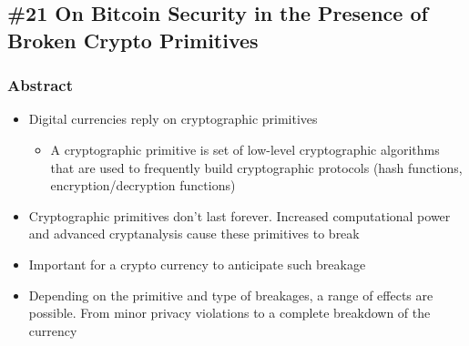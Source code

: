 \subsection{\#21 On Bitcoin Security in the Presence of Broken Crypto Primitives}
\subsubsection{Abstract}
\begin{itemize}
	\item Digital currencies reply on cryptographic primitives
	\begin{itemize}
		\item A cryptographic primitive is set of low-level cryptographic algorithms that are used to frequently build cryptographic protocols (hash functions, encryption/decryption functions)
	\end{itemize}
	\item Cryptographic primitives don't last forever. Increased computational power and advanced cryptanalysis cause these primitives to break
	\item Important for a crypto currency to anticipate such breakage
	\item Depending on the primitive and type of breakages, a range of effects are possible. From minor privacy violations to a complete breakdown of the currency
\end{itemize}